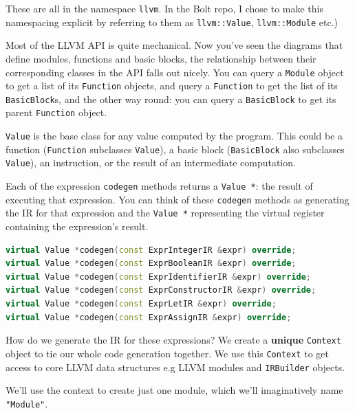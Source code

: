 These are all in the namespace \texttt{llvm}. In the Bolt repo, I chose
to make this namespacing explicit by referring to them as
\texttt{llvm::Value}, \texttt{llvm::Module} etc.)

Most of the LLVM API is quite mechanical. Now you've seen the diagrams
that define modules, functions and basic blocks, the relationship
between their corresponding classes in the API falls out nicely. You can
query a \texttt{Module} object to get a list of its \texttt{Function}
objects, and query a \texttt{Function} to get the list of its
\texttt{BasicBlock}s, and the other way round: you can query a
\texttt{BasicBlock} to get its parent \texttt{Function} object.

\texttt{Value} is the base class for any value computed by the program.
This could be a function (\texttt{Function} subclasses \texttt{Value}),
a basic block (\texttt{BasicBlock} also subclasses \texttt{Value}), an
instruction, or the result of an intermediate computation.

Each of the expression \texttt{codegen} methods returns a
\texttt{Value\ *}: the result of executing that expression. You can
think of these \texttt{codegen} methods as generating the IR for that
expression and the \texttt{Value\ *} representing the virtual register
containing the expression's result.

%

\begin{lstlisting}[caption={ir\_codegen\_visitor.h},language=C++]
virtual Value *codegen(const ExprIntegerIR &expr) override;
virtual Value *codegen(const ExprBooleanIR &expr) override;
virtual Value *codegen(const ExprIdentifierIR &expr) override;
virtual Value *codegen(const ExprConstructorIR &expr) override;
virtual Value *codegen(const ExprLetIR &expr) override;
virtual Value *codegen(const ExprAssignIR &expr) override;
\end{lstlisting}

How do we generate the IR for these expressions? We create a
\textbf{unique} \texttt{Context} object to tie our whole code generation
together. We use this \texttt{Context} to get access to core LLVM data
structures e.g LLVM modules and \texttt{IRBuilder} objects.

We'll use the context to create just one module, which we'll
imaginatively name \texttt{"Module"}.

%

